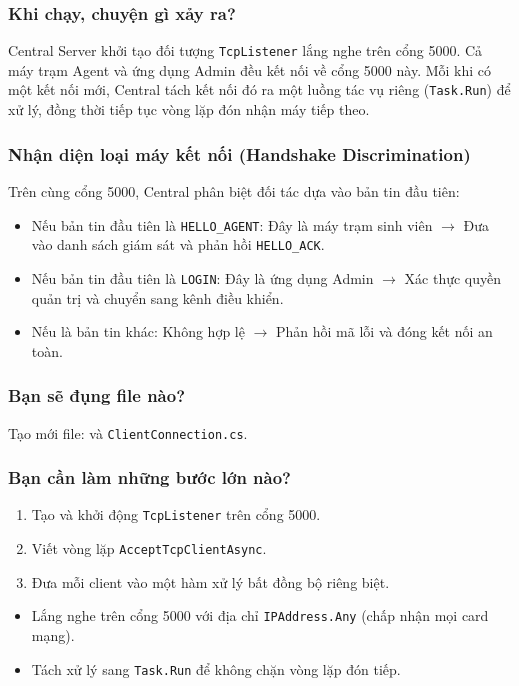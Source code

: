 \documentclass[12pt,a4paper]{article}
\begin{document}
\subsubsection{Khi chạy, chuyện gì xảy ra?}
Central Server khởi tạo đối tượng \texttt{TcpListener} lắng nghe trên cổng 5000. Cả máy trạm Agent và ứng dụng Admin đều kết nối về cổng 5000 này. Mỗi khi có một kết nối mới, Central tách kết nối đó ra một luồng tác vụ riêng (\texttt{Task.Run}) để xử lý, đồng thời tiếp tục vòng lặp đón nhận máy tiếp theo.

\subsubsection{Nhận diện loại máy kết nối (Handshake Discrimination)}
Trên cùng cổng 5000, Central phân biệt đối tác dựa vào bản tin đầu tiên:
\begin{itemize}
  \item Nếu bản tin đầu tiên là \texttt{HELLO\_AGENT}: Đây là máy trạm sinh viên $\rightarrow$ Đưa vào danh sách giám sát và phản hồi \texttt{HELLO\_ACK}.
  \item Nếu bản tin đầu tiên là \texttt{LOGIN}: Đây là ứng dụng Admin $\rightarrow$ Xác thực quyền quản trị và chuyển sang kênh điều khiển.
  \item Nếu là bản tin khác: Không hợp lệ $\rightarrow$ Phản hồi mã lỗi và đóng kết nối an toàn.
\end{itemize}

\subsubsection{Bạn sẽ đụng file nào?}
Tạo mới file:  và \texttt{ClientConnection.cs}.

\subsubsection{Bạn cần làm những bước lớn nào?}
\begin{enumerate}
  \item Tạo và khởi động \texttt{TcpListener} trên cổng 5000.
  \item Viết vòng lặp \texttt{AcceptTcpClientAsync}.
  \item Đưa mỗi client vào một hàm xử lý bất đồng bộ riêng biệt.
\end{enumerate}

\begin{orientationbox}
\begin{itemize}[leftmargin=1.5em, itemsep=1pt]
  \item Lắng nghe trên cổng 5000 với địa chỉ \texttt{IPAddress.Any} (chấp nhận mọi card mạng).
  \item Tách xử lý sang \texttt{Task.Run} để không chặn vòng lặp đón tiếp.
\end{itemize}
\end{orientationbox}
\end{document}
